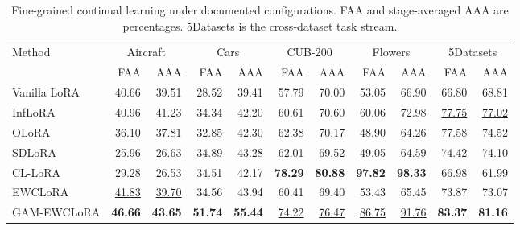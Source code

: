 \begin{table}[t]
\centering
\caption{Fine-grained continual learning under documented configurations. FAA and stage-averaged AAA are percentages. 5Datasets is the cross-dataset task stream.}
\label{tab:exp_fine}
\scriptsize\setlength{\tabcolsep}{2.2pt}\renewcommand{\arraystretch}{1.08}
\begin{tabular*}{\linewidth}{@{\extracolsep{\fill}}l*{10}{r}@{}}
\toprule
Method & \multicolumn{2}{c}{Aircraft} & \multicolumn{2}{c}{Cars} & \multicolumn{2}{c}{CUB-200} & \multicolumn{2}{c}{Flowers} & \multicolumn{2}{c}{5Datasets}\\
\cmidrule(lr){2-3}\cmidrule(lr){4-5}\cmidrule(lr){6-7}\cmidrule(lr){8-9}\cmidrule(lr){10-11}
 & FAA & AAA & FAA & AAA & FAA & AAA & FAA & AAA & FAA & AAA\\
\midrule
Vanilla LoRA & 40.66 & 39.51 & 28.52 & 39.41 & 57.79 & 70.00 & 53.05 & 66.90 & 66.80 & 68.81\\
InfLoRA & 40.96 & 41.23 & 34.34 & 42.20 & 60.61 & 70.60 & 60.06 & 72.98 & \underline{77.75} & \underline{77.02}\\
OLoRA & 36.10 & 37.81 & 32.85 & 42.30 & 62.38 & 70.17 & 48.90 & 64.26 & 77.58 & 74.52\\
SDLoRA & 25.96 & 26.63 & \underline{34.89} & \underline{43.28} & 62.01 & 69.52 & 49.05 & 64.59 & 74.42 & 74.10\\
CL-LoRA & 29.28 & 26.53 & 34.51 & 42.17 & \textbf{78.29} & \textbf{80.88} & \textbf{97.82} & \textbf{98.33} & 66.98 & 61.99\\
EWCLoRA & \underline{41.83} & \underline{39.70} & 34.56 & 43.94 & 60.41 & 69.40 & 53.43 & 65.45 & 73.87 & 73.07\\
GAM-EWCLoRA & \textbf{46.66} & \textbf{43.65} & \textbf{51.74} & \textbf{55.44} & \underline{74.22} & \underline{76.47} & \underline{86.75} & \underline{91.76} & \textbf{83.37} & \textbf{81.16}\\
\bottomrule
\end{tabular*}
\end{table}
